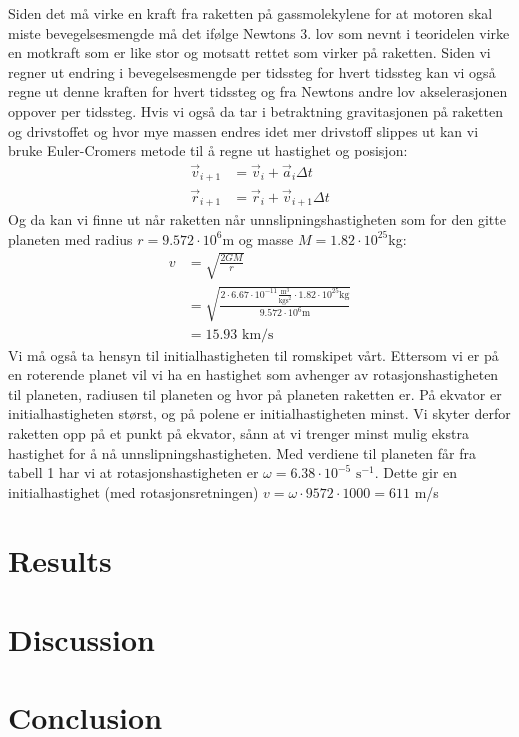 \documentclass[reprint,english,notitlepage]{revtex4-1}
\begin{document}
	Siden det må virke en kraft fra raketten på gassmolekylene for at motoren skal miste
	bevegelsesmengde må det ifølge Newtons 3. lov som nevnt i teoridelen virke en motkraft
	som er like stor og motsatt rettet som virker på raketten. Siden vi regner ut endring
	i bevegelsesmengde per tidssteg for hvert tidssteg kan vi også regne ut denne
	kraften for hvert tidssteg og fra Newtons andre lov akselerasjonen oppover per
	tidssteg. Hvis vi også da tar i betraktning gravitasjonen på raketten og drivstoffet
	og hvor mye massen endres idet mer drivstoff slippes ut kan vi bruke Euler-Cromers
	metode til å regne ut hastighet og posisjon:
	\begin{align*}
		\vec{v}_{i+1} &= \vec{v}_i + \vec{a}_i\Delta t \\
		\vec{r}_{i+1} &= \vec{r}_i + \vec{v}_{i+1}\Delta t
	\end{align*}
	Og da kan vi finne ut når raketten når unnslipningshastigheten som for den gitte planeten
	med radius $r = 9.572\cdot10^6$m og masse $M = 1.82\cdot10^{25}$kg:
	\begin{align*}
		v &= \sqrt{\frac{2GM}{r}}\\
		&= \sqrt{\frac{2\cdot 6.67\cdot10^{-11}\frac{\text{m}^3}{\text{kgs}^2}\cdot1.82\cdot10^{25}\text{kg}}{9.572\cdot10^6\text{m}}}\\
		&= 15.93\text{ km/s}
	\end{align*}
	Vi må også ta hensyn til initialhastigheten til romskipet vårt. Ettersom vi er
	på en roterende planet vil vi ha en hastighet som avhenger av rotasjonshastigheten
	til planeten, radiusen til planeten og hvor på planeten raketten er. På ekvator
	er initialhastigheten størst, og på polene er initialhastigheten minst. Vi skyter
	derfor raketten opp på et punkt på ekvator, sånn at vi trenger minst mulig ekstra
	hastighet for å nå unnslipningshastigheten. Med verdiene til planeten får fra
	tabell 1 har vi at rotasjonshastigheten er $\omega = 6.38\cdot10^{-5}\text{ s}^{-1}$.
	Dette gir en initialhastighet (med rotasjonsretningen) $v = \omega \cdot 9572 \cdot 1000 = 611$ m/s

\section{Results}
\section{Discussion}
\section{Conclusion}
\end{document}
